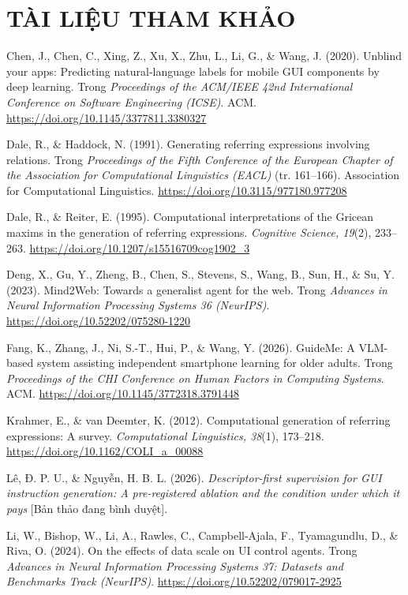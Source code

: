 \documentclass[12pt,a4paper,onecolumn]{article}
\newcommand{\ôvuông}[2]{\tikz[baseline=-0.45ex]{\draw[#1,line width=0.9pt,#2] (0,0) rectangle (0.34,0.18);}}
\newenvironment{apareferences}{%
  \newpage
  \section*{TÀI LIỆU THAM KHẢO}%
  \setstretch{1.0}%
  \sloppy%
  \setlength{\parindent}{0pt}%
  \setlength{\parskip}{6pt plus 1pt}%
  \begin{list}{}{%
    \setlength{\leftmargin}{36pt}%
    \setlength{\itemindent}{-36pt}%
    \setlength{\listparindent}{0pt}%
    \setlength{\labelwidth}{0pt}%
    \setlength{\labelsep}{0pt}%
    \setlength{\itemsep}{6pt}%
    \setlength{\parsep}{0pt}%
    \setlength{\topsep}{0pt}}%
}{\end{list}}
\newcommand{\apaitem}{\item[]}
\begin{document}
\begin{apareferences}

\apaitem Chen, J., Chen, C., Xing, Z., Xu, X., Zhu, L., Li, G., \& Wang, J. (2020).
Unblind your apps: Predicting natural-language labels for mobile GUI components by deep
learning. Trong \emph{Proceedings of the ACM/IEEE 42nd International Conference on Software
Engineering (ICSE)}. ACM.
\url{https://doi.org/10.1145/3377811.3380327}

\apaitem Dale, R., \& Haddock, N. (1991). Generating referring expressions involving
relations. Trong \emph{Proceedings of the Fifth Conference of the European Chapter of the
Association for Computational Linguistics (EACL)} (tr. 161--166). Association for
Computational Linguistics.
\url{https://doi.org/10.3115/977180.977208}

\apaitem Dale, R., \& Reiter, E. (1995). Computational interpretations of the Gricean
maxims in the generation of referring expressions. \emph{Cognitive Science, 19}(2),
233--263.
\url{https://doi.org/10.1207/s15516709cog1902_3}

\apaitem Deng, X., Gu, Y., Zheng, B., Chen, S., Stevens, S., Wang, B., Sun, H., \& Su, Y.
(2023). Mind2Web: Towards a generalist agent for the web. Trong \emph{Advances in Neural
Information Processing Systems 36 (NeurIPS)}.
\url{https://doi.org/10.52202/075280-1220}

\apaitem Fang, K., Zhang, J., Ni, S.-T., Hui, P., \& Wang, Y. (2026). GuideMe: A VLM-based
system assisting independent smartphone learning for older adults. Trong \emph{Proceedings
of the CHI Conference on Human Factors in Computing Systems}. ACM.
\url{https://doi.org/10.1145/3772318.3791448}

\apaitem Krahmer, E., \& van Deemter, K. (2012). Computational generation of referring
expressions: A survey. \emph{Computational Linguistics, 38}(1), 173--218.
\url{https://doi.org/10.1162/COLI_a_00088}

\apaitem Lê, Đ. P. U., \& Nguyễn, H. B. L. (2026). \emph{Descriptor-first supervision for
GUI instruction generation: A pre-registered ablation and the condition under which it
pays} [Bản thảo đang bình duyệt].

\apaitem Li, W., Bishop, W., Li, A., Rawles, C., Campbell-Ajala, F., Tyamagundlu, D., \&
Riva, O. (2024). On the effects of data scale on UI control agents. Trong \emph{Advances in
Neural Information Processing Systems 37: Datasets and Benchmarks Track (NeurIPS)}.
\url{https://doi.org/10.52202/079017-2925}


\end{apareferences}
\end{document}

